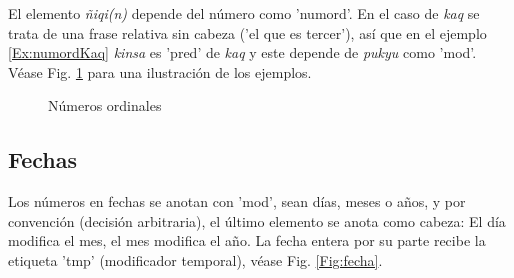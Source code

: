 \documentclass[a4paper,11pt,DIV12]{scrartcl}
\begin{document}
El elemento {\em \~niqi(n)} depende del n\'umero como 'numord'. En el caso de {\em kaq} se trata de una frase relativa sin cabeza ('el que es tercer'), as\'i que en el ejemplo \ref{Ex:numordKaq} {\em kinsa} es 'pred' de {\em kaq} y este depende de {\em pukyu} como 'mod'.
V\'ease Fig. \ref{Fig:numord} para una ilustraci\'on de los ejemplos.

\begin{figure}
\begin{center}
 \caption{N\'umeros ordinales}\label{Fig:numord}
\end{center}
\end{figure}

\subsection{Fechas}

Los n\'umeros en fechas se anotan con 'mod', sean d\'ias, meses o a\~nos, y por convenci\'on (decisi\'on arbitraria), el \'ultimo elemento se anota como cabeza: El d\'ia modifica el mes, el mes modifica el a\~no. La fecha entera por su parte recibe la etiqueta 'tmp' (modificador temporal), v\'ease Fig. \ref{Fig:fecha}.
\end{document}

